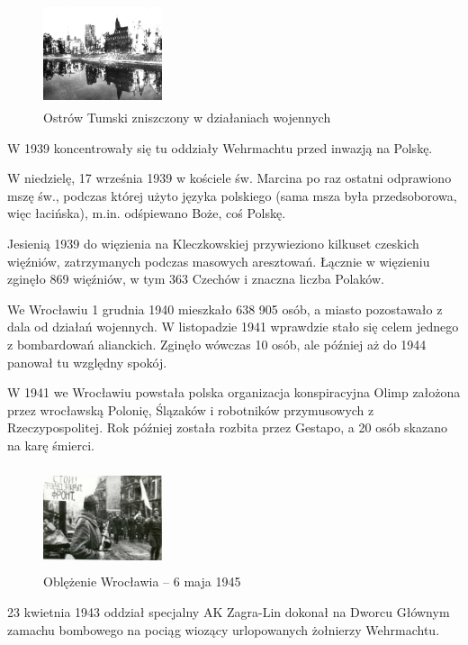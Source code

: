 \documentclass{article}
\begin{document}
\begin{figure}
\includegraphics[width= 3.5cm, height= 3.0cm]{images/Zdjecie13.png}
\caption{Ostrów Tumski zniszczony w działaniach wojennych}
\end{figure}

W 1939 koncentrowały się tu oddziały Wehrmachtu przed inwazją na Polskę.

W niedzielę, 17 września 1939 w kościele św. Marcina po raz ostatni odprawiono mszę św., podczas której użyto języka polskiego (sama msza była przedsoborowa, więc łacińska), m.in. odśpiewano Boże, coś Polskę.

Jesienią 1939 do więzienia na Kleczkowskiej przywieziono kilkuset czeskich więźniów, zatrzymanych podczas masowych aresztowań. Łącznie w więzieniu zginęło 869 więźniów, w tym 363 Czechów i znaczna liczba Polaków.

We Wrocławiu 1 grudnia 1940 mieszkało 638 905 osób, a miasto pozostawało z dala od działań wojennych. W listopadzie 1941 wprawdzie stało się celem jednego z bombardowań alianckich. Zginęło wówczas 10 osób, ale później aż do 1944 panował tu względny spokój.

W 1941 we Wrocławiu powstała polska organizacja konspiracyjna Olimp założona przez wrocławską Polonię, Ślązaków i robotników przymusowych z Rzeczypospolitej. Rok później została rozbita przez Gestapo, a 20 osób skazano na karę śmierci.

\begin{figure}
\includegraphics[width= 3.5cm, height= 3cm]{images/Zdjecie14.jpg}
\caption{Oblężenie Wrocławia – 6 maja 1945}
\end{figure}

23 kwietnia 1943 oddział specjalny AK Zagra-Lin dokonał na Dworcu Głównym zamachu bombowego na pociąg wiozący urlopowanych żołnierzy Wehrmachtu.
\end{document}
